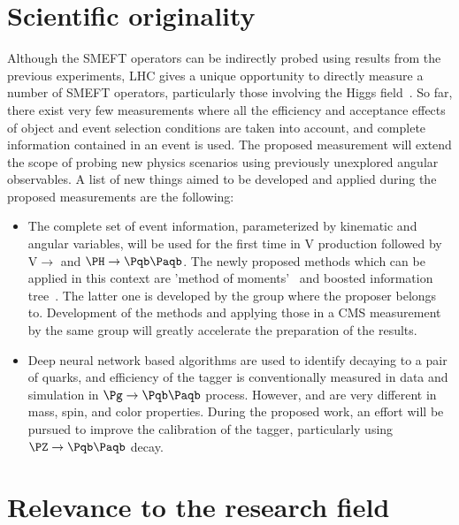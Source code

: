 \documentclass[a4paper,11pt]{article}
\newcommand{\Pb}{{{\Pqb}}\xspace}
\newcommand{\PAb}{{{{\Paqb}}}\xspace}
\renewcommand{\PV}{{{{V}}}\xspace}
\newcommand{\VH}{{{\PV}{\PH}}\xspace}
\begin{document}
\section{Scientific originality}

Although the SMEFT operators can be indirectly probed using results from the previous experiments, 
LHC gives a unique opportunity to directly measure a number of SMEFT operators, particularly those involving the Higgs field~\cite{Elias-Miro:2013mua,Gupta:2014rxa}. 
So far, there exist very few measurements where all the efficiency and acceptance effects of object and event selection conditions are taken into account, and complete information contained in an event is used.
The proposed measurement will extend the scope of probing new physics scenarios using previously unexplored angular observables.%
A list of new things aimed to be developed and applied during the proposed measurements are the following:
\begin{itemize}

\item The complete set of event information, parameterized by kinematic and angular variables, will be used for the first time in \VH production followed by \PV $\to$ \Pl \Pl and $\PH \to \Pb \PAb$. 
The newly proposed methods which can be applied in this context are 
'method of moments'~\cite{Banerjee:2019twi,Banerjee:2020vtm} and 
boosted information tree~\cite{Chatterjee:2021nms}.
The latter one is developed by the group where the proposer belongs to. 
Development of the methods and applying those in a CMS measurement by the same group will greatly accelerate the preparation of the results. 

\item Deep neural network based algorithms are used to identify \PH decaying to a pair of \Pb quarks, and efficiency of the tagger is conventionally measured in data and simulation in $\Pg \to \Pb \PAb$ process. 
However, \Pg and \PH are very different in mass, spin, and color properties. During the proposed work, an effort will be pursued to improve the calibration of the tagger, 
particularly using $\PZ \to \Pb \PAb$ decay.

\end{itemize}


\section{Relevance to the research field}
\end{document}
